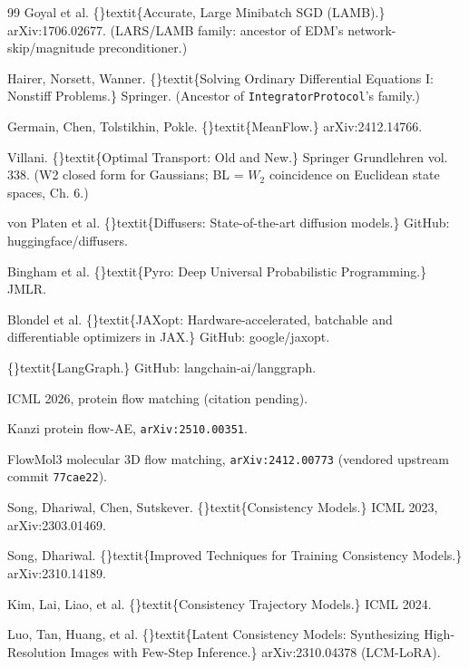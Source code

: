 \documentclass{article}
\begin{document}
\begin{thebibliography}{99}
 Goyal et al. \{\}textit\{Accurate, Large Minibatch SGD (LAMB).\} arXiv:1706.02677. (LARS/LAMB family: ancestor of EDM's network-skip/magnitude preconditioner.)

 Hairer, Norsett, Wanner. \{\}textit\{Solving Ordinary Differential Equations I: Nonstiff Problems.\} Springer. (Ancestor of \texttt{IntegratorProtocol}'s  family.)

 Germain, Chen, Tolstikhin, Pokle. \{\}textit\{MeanFlow.\} arXiv:2412.14766.

 Villani. \{\}textit\{Optimal Transport: Old and New.\} Springer Grundlehren vol. 338. (W2 closed form for Gaussians; BL = $W_2$ coincidence on Euclidean state spaces, Ch. 6.)

 von Platen et al. \{\}textit\{Diffusers: State-of-the-art diffusion models.\} GitHub: huggingface/diffusers.

 Bingham et al. \{\}textit\{Pyro: Deep Universal Probabilistic Programming.\} JMLR.

 Blondel et al. \{\}textit\{JAXopt: Hardware-accelerated, batchable and differentiable optimizers in JAX.\} GitHub: google/jaxopt.

 \{\}textit\{LangGraph.\} GitHub: langchain-ai/langgraph.

 ICML 2026, protein flow matching (citation pending).

 Kanzi  protein flow-AE, \texttt{arXiv:2510.00351}.

 FlowMol3  molecular 3D flow matching, \texttt{arXiv:2412.00773} (vendored upstream commit \texttt{77cae22}).

 Song, Dhariwal, Chen, Sutskever. \{\}textit\{Consistency Models.\} ICML 2023, arXiv:2303.01469.

 Song, Dhariwal. \{\}textit\{Improved Techniques for Training Consistency Models.\} arXiv:2310.14189.

 Kim, Lai, Liao, et al. \{\}textit\{Consistency Trajectory Models.\} ICML 2024.

 Luo, Tan, Huang, et al. \{\}textit\{Latent Consistency Models: Synthesizing High-Resolution Images with Few-Step Inference.\} arXiv:2310.04378 (LCM-LoRA).


\end{thebibliography}
\end{document}
